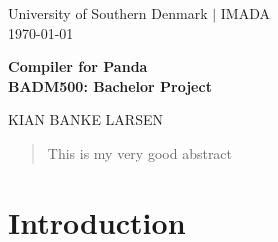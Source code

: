 
\usepackage{amssymb}
\pagestyle{fancy}
\setlength{\headsep}{15pt}
\setlength{\headheight}{15pt}
\rhead{\datedate}


\begin{titlepage}
\begin{centering}
\vspace*{-20px}\large University of Southern Denmark $|$ IMADA \\
\today \\

\vspace{4CM}

\huge{\bf  Compiler for Panda} \\
\Large{\bf BADM500: Bachelor Project}

\vspace{\fill}

\fontsize{16}{19.2} {
    \selectfont
    KIAN BANKE LARSEN
} \\

\vspace{\fill}

\vspace*{-0.95cm} %

\end{centering}

\thispagestyle{empty}
\end{titlepage}

\newpage
\setcounter{page}{0}
\thispagestyle{empty}

\begin{abstract}
    This is my very good abstract
\end{abstract}

{ \hypersetup{hidelinks} \tableofcontents }

\chapter{Introduction}
